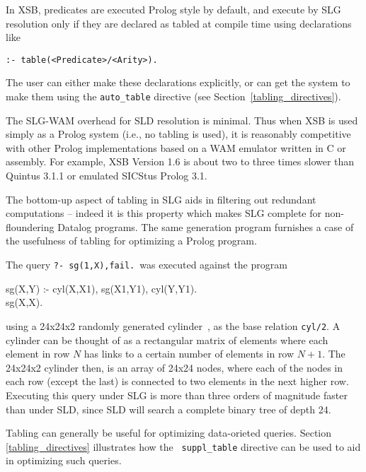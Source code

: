 In XSB, predicates are executed Prolog style by default, and execute
by SLG resolution only if they are declared as tabled at compile time
using declarations like
\begin{center}
{\tt :- table(<Predicate>/<Arity>).}
\end{center}
The user can either make these declarations explicitly, or can get the
system to make them using the {\tt auto\_table} directive (see
Section~\ref{tabling_directives}).

The SLG-WAM overhead for SLD resolution is minimal.  Thus when XSB is
used simply as a Prolog system (i.e., no tabling is used), it is
reasonably competitive with other Prolog implementations based on a
WAM emulator written in C or assembly.  For example, XSB Version 1.6
is about two to three times slower than Quintus 3.1.1 or emulated
SICStus Prolog 3.1.

The bottom-up aspect of tabling in SLG aids in filtering out redundant
computations -- indeed it is this property which makes SLG complete
for non-floundering Datalog programs.  The same generation program
furnishes a case of the usefulness of tabling for optimizing a Prolog
program.
\begin{example} \label{ex:same-gen} {\rm
The query {\tt ?- sg(1,X),fail.}\ was executed against the program
\begin{center}
\begin{Prog}
    sg(X,Y) :- cyl(X,X1), sg(X1,Y1), cyl(Y,Y1).	\\
    sg(X,X).
\end{Prog}
\end{center}
using a 24x24x2 randomly generated cylinder~\cite{BaRa86}, as the base
relation {\tt cyl/2}.  A cylinder can be thought of as a rectangular
matrix of elements where each element in row $N$ has links to a
certain number of elements in row $N+1$.  The 24x24x2 cylinder then,
is an array of 24x24 nodes, where each of the nodes in each row
(except the last) is connected to two elements in the next higher row.
Executing this query under SLG is more than three orders of magnitude
faster than under SLD, since SLD will search a complete binary tree of
depth 24.  }
\end{example}

Tabling can generally be useful for optimizing data-orieted queries.
Section \ref{tabling_directives} illustrates how the {\tt
suppl\_table} directive can be used to aid in optimizing such queries.

